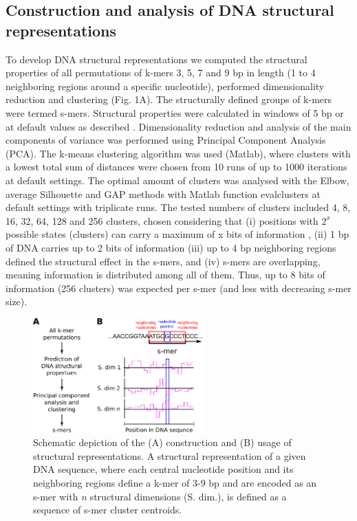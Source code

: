 \documentclass[sigconf]{acmart}
\begin{document}
\subsection{Construction and analysis of DNA structural representations}
To develop DNA structural representations we computed the structural properties of all permutations of k-mers 3, 5, 7 and 9 bp in length (1 to 4 neighboring regions around a specific nucleotide), performed dimensionality reduction and clustering (Fig. 1A). The structurally defined groups of k-mers were termed s-mers. Structural properties were calculated in windows of 5 bp or at default values as described \cite{Zrimec2015-xf,Zrimec2018-lx}. Dimensionality reduction and analysis of the main components of variance was performed using Principal Component Analysis (PCA). The k-means clustering algorithm was used (Matlab), where clusters with a lowest total sum of distances were chosen from 10 runs of up to 1000 iterations at default settings. The optimal amount of clusters was analysed with the Elbow, average Silhouette and GAP methods with Matlab function evalclusters at default settings with triplicate runs. The tested numbers of clusters included 4, 8, 16, 32, 64, 128 and 256 clusters, chosen considering that (i) positions with $2^x$ possible states (clusters) can carry a maximum of x bits of information \cite{Watson2008-dt}, (ii) 1 bp of DNA carries up to 2 bits of information (iii) up to 4 bp neighboring regions defined the structural effect in the s-mers, and (iv) s-mers are overlapping, meaning information is distributed among all of them. Thus, up to 8 bits of information (256 clusters) was expected per s-mer (and less with decreasing s-mer size). 

\begin{figure}[ht]
  \centering
  \includegraphics[width=6.5cm,keepaspectratio]{smir_fig_smers.png}
  \caption{Schematic depiction of the (A) construction and (B) usage of structural representations. A structural representation of a given DNA sequence, where each central nucleotide position and its neighboring regions define a k-mer of 3-9 bp and are encoded as an s-mer with \textit{n} structural dimensions (S. dim.), is defined as a sequence of s-mer cluster centroids.}
\end{figure}
\end{document}

